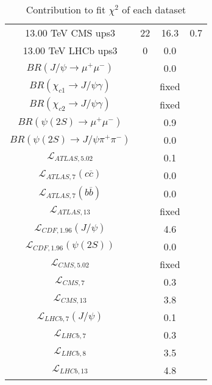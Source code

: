 \begin{table}[h!]
\begin{tabular}{c|c|c|c}
13.00 TeV CMS ups3 & 22 & 16.3 & 0.7 \\
13.00 TeV LHCb ups3 & 0 & 0.0 &  \\
\hline
$BR(J/\psi\rightarrow\mu^+\mu^-)$ &  & 0.0 &  \\
$BR(\chi_{c1}\rightarrow J/\psi\gamma)$ &  & fixed & \\
$BR(\chi_{c2}\rightarrow J/\psi\gamma)$ &  & fixed & \\
$BR(\psi(2S)\rightarrow\mu^+\mu^-)$ &  & 0.9 &  \\
$BR(\psi(2S)\rightarrow J/\psi\pi^+\pi^-)$ &  & 0.0 &  \\
$\mathcal L_{ATLAS,5.02}$ &  & 0.1 &  \\
$\mathcal L_{ATLAS,7}(c\overline c)$ &  & 0.0 &  \\
$\mathcal L_{ATLAS,7}(b\overline b)$ &  & 0.0 &  \\
$\mathcal L_{ATLAS,13}$ &  & fixed & \\
$\mathcal L_{CDF,1.96}(J/\psi)$ &  & 4.6 &  \\
$\mathcal L_{CDF,1.96}(\psi(2S))$ &  & 0.0 &  \\
$\mathcal L_{CMS,5.02}$ &  & fixed & \\
$\mathcal L_{CMS,7}$ &  & 0.3 &  \\
$\mathcal L_{CMS,13}$ &  & 3.8 &  \\
$\mathcal L_{LHCb,7}(J/\psi)$ &  & 0.1 &  \\
$\mathcal L_{LHCb,7}$ &  & 0.3 &  \\
$\mathcal L_{LHCb,8}$ &  & 3.5 &  \\
$\mathcal L_{LHCb,13}$ &  & 4.8 &  \\
\end{tabular}
\caption{Contribution to fit $\chi^2$ of each dataset}
\end{table}
